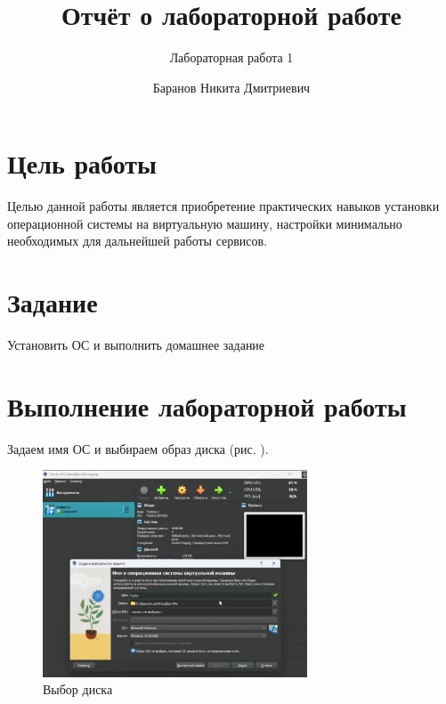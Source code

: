 \documentclass[
  12pt,
  a4paper,
  DIV=11,
  numbers=noendperiod]{scrreprt}
\title{Отчёт о лабораторной работе}
\subtitle{Лабораторная работа 1}
\author{Баранов Никита Дмитриевич}
\date{}
\renewcommand*\contentsname{Содержание}
\newcommand\contentsname{Содержание}
\begin{document}
\maketitle

\renewcommand*\contentsname{Содержание}
{
\setcounter{tocdepth}{1}
\tableofcontents
}
\listoffigures
\listoftables
{}
\chapter{Цель
работы}\label{ux446ux435ux43bux44c-ux440ux430ux431ux43eux442ux44b}

Целью данной работы является приобретение практических навыков установки
операционной системы на виртуальную машину, настройки минимально
необходимых для дальнейшей работы сервисов.

\chapter{Задание}\label{ux437ux430ux434ux430ux43dux438ux435}

Установить ОС и выполнить домашнее задание

\chapter{Выполнение лабораторной
работы}\label{ux432ux44bux43fux43eux43bux43dux435ux43dux438ux435-ux43bux430ux431ux43eux440ux430ux442ux43eux440ux43dux43eux439-ux440ux430ux431ux43eux442ux44b}

Задаем имя ОС и выбираем образ диска (рис. \autocite*{fig:001}).

\begin{figure}

{\centering \includegraphics[width=0.7\textwidth,height=\textheight]{image/1.jpg}

}

\caption{Выбор диска}

\end{figure}%
\end{document}
